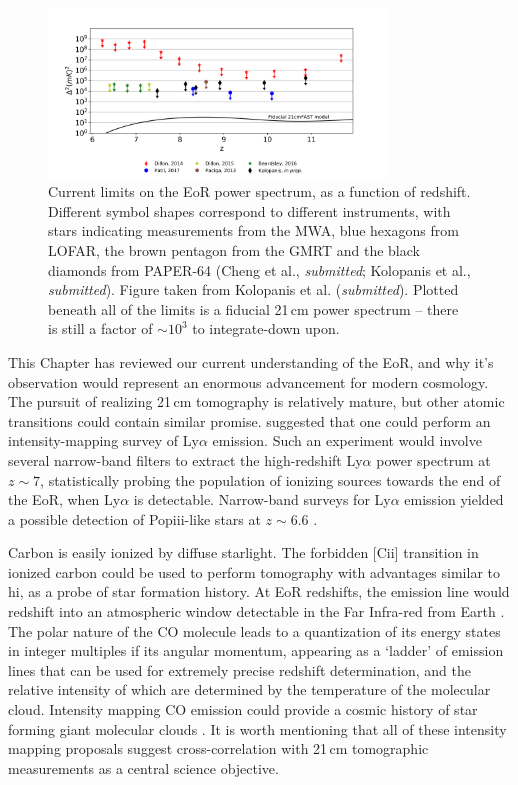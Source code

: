 \begin{figure}
\centering
\includegraphics[width=0.8\textwidth]{chapters/eor_intro/figures/eor_lowest_limits.png}
\caption[Current limits on the EoR power spectrum, as a function of redshift.]{Current limits on the EoR power spectrum, as a function of redshift. Different symbol shapes correspond to different instruments, with stars \citep{Dillon.14, Dillon.15, Beardsley.16} indicating measurements from the MWA, blue hexagons \citep{Patil.17} from LOFAR, the brown pentagon from the GMRT \citep{Paciga.13} and the black diamonds from PAPER-64 (Cheng et al., \textit{submitted}; Kolopanis et al., \textit{submitted}). Figure taken from Kolopanis et al. (\textit{submitted}). Plotted beneath all of the limits is a fiducial 21\,cm power spectrum \citep{Mesinger.11} -- there is still a factor of $\sim 10^3$ to integrate-down upon.}
\label{fig:eor_intro_pspec_limits}
\end{figure}

This Chapter has reviewed our current understanding of the EoR, and why it's observation would represent an enormous advancement for modern cosmology. The pursuit of realizing 21\,cm tomography is relatively mature, but other atomic transitions could contain similar promise. \cite{Silva.13} suggested that one could perform an intensity-mapping survey of Ly$\alpha$ emission. Such an experiment would involve several narrow-band filters to extract the high-redshift Ly$\alpha$ power spectrum at $z\sim7$, statistically probing the population of ionizing sources towards the end of the EoR, when Ly$\alpha$ is detectable. Narrow-band surveys for Ly$\alpha$ emission yielded a possible detection of Pop{\sc iii}-like stars at $z\sim 6.6$ \citep{Sobral.15}.

Carbon is easily ionized by diffuse starlight. The forbidden [C{\sc ii}] transition in ionized carbon could be used to perform tomography with advantages similar to {\sc hi}, as a probe of star formation history. At EoR redshifts, the emission line would redshift into an atmospheric window detectable in the Far Infra-red from Earth \citep[e.g.][]{Gong.12, Hunacek.16, Pentericci.16}. 
The polar nature of the CO molecule leads to a quantization of its energy states in integer multiples if its angular momentum, appearing as a `ladder' of emission lines that can be used for extremely precise redshift determination, and the relative intensity of which are determined by the temperature of the molecular cloud. Intensity mapping CO emission could provide a cosmic history of star forming giant molecular clouds \citep[e.g.][]{Righi.08,Lidz.11.CO}.
It is worth mentioning that all of these intensity mapping proposals suggest cross-correlation with 21\,cm tomographic measurements as a central science objective.

